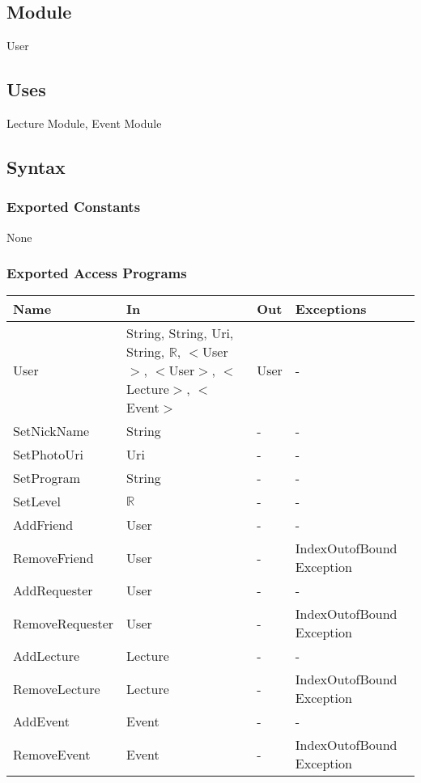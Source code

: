 \documentclass[12pt, titlepage]{article}
\begin{document}
\subsection{Module}

User

\subsection{Uses}

Lecture Module, Event Module

\subsection{Syntax}

\subsubsection{Exported Constants}
None

\subsubsection{Exported Access Programs}
\begin{center}
\begin{tabular}{p{4cm} p{2cm} p{4cm} p{4cm}}
\hline
\textbf{Name} & \textbf{In} & \textbf{Out} & \textbf{Exceptions} \\
\hline
User & String, String, Uri, String, $\mathbb{R}$, $<$User$>$, $<$User$>$, $<$Lecture$>$, $<$Event$>$ & User & -\\
SetNickName & String & - & -\\
SetPhotoUri & Uri & - & -\\
SetProgram & String & - & -\\
SetLevel & $\mathbb{R}$ & - & -\\
AddFriend & User & - & -\\
RemoveFriend & User & - & IndexOutofBound Exception\\
AddRequester & User & - & -\\
RemoveRequester & User & - & IndexOutofBound Exception\\
AddLecture & Lecture & - & -\\
RemoveLecture & Lecture & - & IndexOutofBound Exception\\
AddEvent & Event & - & -\\
RemoveEvent & Event & - & IndexOutofBound Exception\\
\hline
\end{tabular}
\end{center}
\end{document}
